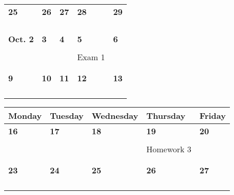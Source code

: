 \documentclass[letter, 12pt]{article}
\begin{document}
\begin{center}
\begin{tabular}{|l|l|l|l|l|}

\textbf{25} & \textbf{26} & \textbf{27} & \textbf{28} & \textbf{29} \\
&  &  &   & \\
%
&  &  &  & \\
%
&  &  &  & \\
%
&  &  &  & \\
\hline



\textbf{Oct. 2} & \textbf{3} & \textbf{4} & \textbf{5} & \textbf{6} \\
&  &  &  & \\
%
&  &  &Exam 1  & \\
%
&  &  &  & \\
%
&  &  &  & \\
\hline

\textbf{9} & \textbf{10} & \textbf{11} & \textbf{12} & \textbf{13} \\
& &  &   & \\
%
&  &  &  & \\
%
&  &  &  & \\
%
&  &  &  & \\
\hline
\end{tabular}
\begin{tabular}{|l|l|l|l|l|}
\hline
{\bf \phantom{xx}Monday\phantom{x}}
 & {\bf \phantom{xx}Tuesday\phantom{x}}
 & {\bf \phantom{x}Wednesday\phantom{}}
 & {\bf \phantom{x}Thursday\phantom{x}}
 & {\bf \phantom{xx}Friday\phantom{xx}} \\
\hline

\textbf{16} & \textbf{17} & \textbf{18} & \textbf{19} & \textbf{20} \\
&  &  &  & \\
%
&  &  &Homework 3  & \\
%
&  &  &  & \\
%
&  &  &  & \\
\hline

\textbf{23} & \textbf{24} & \textbf{25} & \textbf{26} & \textbf{27} \\
&  &  &  & \\
%
&  &  &  & \\
%
&  &  &  & \\
%
&  &  &  & \\
\hline


\end{tabular}
\end{center}
\end{document}
